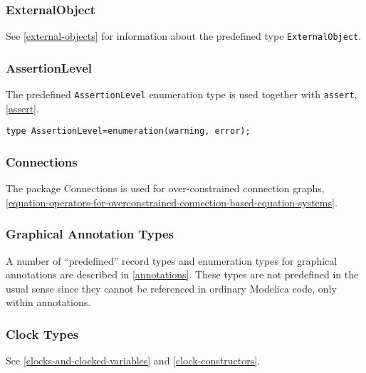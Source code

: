 \subsubsection{ExternalObject}\label{externalobject}

See \cref{external-objects} for information about the predefined type
\lstinline!ExternalObject!.

\subsubsection{AssertionLevel}\label{assertionlevel}

The predefined \lstinline!AssertionLevel! enumeration type is used together with
\lstinline!assert!, \cref{assert}.
\begin{lstlisting}[language=modelica]
type AssertionLevel=enumeration(warning, error);
\end{lstlisting}

\subsubsection{Connections}\label{connections}

The package Connections is used for over-constrained connection graphs,
\cref{equation-operators-for-overconstrained-connection-based-equation-systems}.

\subsubsection{Graphical Annotation Types}\label{graphical-annotation-types}

A number of ``predefined'' record types and enumeration types for
graphical annotations are described in \cref{annotations}. These types are not
predefined in the usual sense since they cannot be referenced in
ordinary Modelica code, only within annotations.

\subsubsection{Clock Types}\label{clock-types}

See \cref{clocks-and-clocked-variables} and \cref{clock-constructors}.
